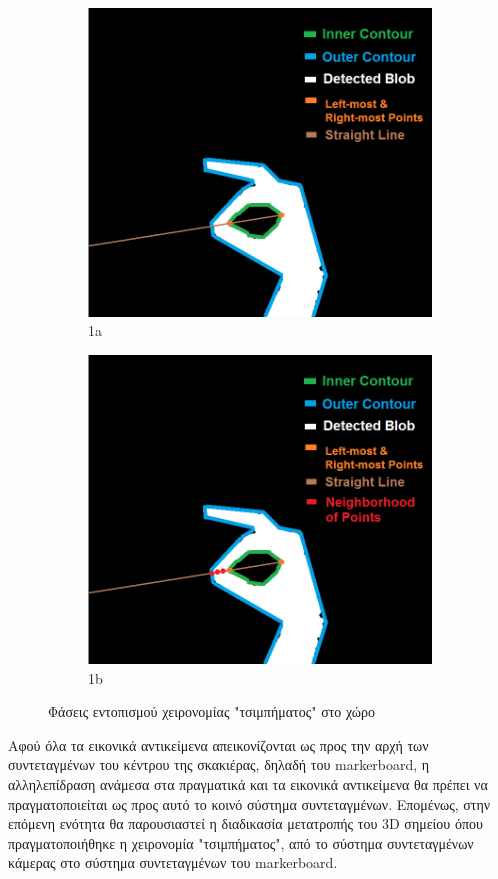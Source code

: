 \begin{figure}[H]
\begin{subfigure}{.5\textwidth}
  \label{fig:sfig2}
\end{subfigure}\\
\begin{subfigure}{.5\textwidth}
  \centering
  \includegraphics[width=.8\linewidth]{Files/Figures/4.png}
  \caption{1a}
  \label{fig:sfig1}
\end{subfigure}%
\begin{subfigure}{.5\textwidth}
  \centering
  \includegraphics[width=.8\linewidth]{Files/Figures/5.png}
  \caption{1b}
  \label{fig:sfig2}
\end{subfigure}
\caption{Φάσεις εντοπισμού χειρονομίας "τσιμπήματος" στο χώρο}
\label{fig:fig}
\end{figure}



Αφού όλα τα εικονικά αντικείμενα απεικονίζονται ως προς την αρχή των συντεταγμένων του κέντρου της σκακιέρας, δηλαδή του markerboard, η αλληλεπίδραση ανάμεσα στα πραγματικά και τα εικονικά αντικείμενα θα πρέπει να πραγματοποιείται ως προς αυτό το κοινό σύστημα συντεταγμένων. Επομένως, στην επόμενη ενότητα θα παρουσιαστεί η διαδικασία μετατροπής του 3D σημείου όπου πραγματοποιήθηκε η χειρονομία "τσιμπήματος", από το σύστημα συντεταγμένων κάμερας στο σύστημα συντεταγμένων του markerboard.



